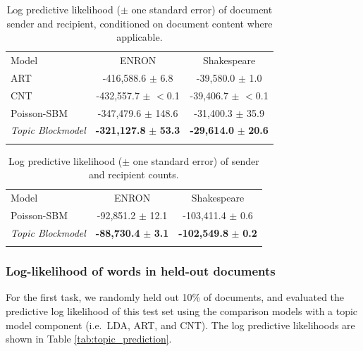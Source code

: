         \begin{table}[ht]
        	\caption{Log predictive likelihood ($\pm$ one standard error) of document sender and recipient, conditioned on document content where applicable.}
        	\centering
        	\label{tab:sr_prediction}
        	\begin{tabular}{l c c}
        		Model & ENRON &  Shakespeare   \\
        		\noalign{\smallskip}\hline\noalign{\smallskip}
        		ART				& -416,588.6		$\pm$  6.8		&	-39,580.0 	$\pm$  1.0 \\
        		CNT				& -432,557.7		$\pm$   $<$0.1		&	-39,406.7 	$\pm$  $<$0.1 \\
        		 Poisson-SBM			& -347,479.6		$\pm$  148.6	&	-31,400.3 	$\pm$  35.9 \\
        		\textit{Topic Blockmodel}			& \textbf{-321,127.8} 	$\mathbf{\pm}$  \textbf{53.3}	&	\textbf{-29,614.0} 	 $\mathbf{\pm}$  \textbf{20.6} \\
        	\noalign{\smallskip}\hline
        	\end{tabular}
        \end{table}
        
        \begin{table}[ht]
        	\caption{Log predictive likelihood ($\pm$ one standard error) of sender and recipient counts.}
        	\centering
        	\label{tab:count_prediction}
        	\begin{tabular}{l c c}
        		Model & ENRON &  Shakespeare   \\
        		\noalign{\smallskip}\hline\noalign{\smallskip}
        		 Poisson-SBM			& -92,851.2		$\pm$  12.1	&	-103,411.4 	$\pm$  0.6 \\
        		\textit{Topic Blockmodel}			& \textbf{-88,730.4} 	$\mathbf{\pm}$  \textbf{3.1}	&	\textbf{-102,549.8} 	 $\mathbf{\pm}$  \textbf{0.2} \\
        	\noalign{\smallskip}\hline
        	\end{tabular}
        \end{table}

    \subsubsection{Log-likelihood of words in held-out documents}
    
        For the first task, we randomly held out 10\% of documents, and evaluated the predictive log likelihood of this test set using the  comparison models with a topic model component (i.e.\ LDA, ART, and CNT). The log predictive likelihoods are shown in Table \ref{tab:topic_prediction}. 
    
